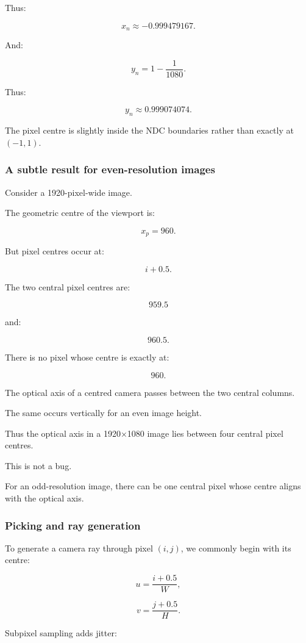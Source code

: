 Thus:

\[
 \boxed{x_n\approx-0.999479167}.
\]

And:

\[
 y_n=1-\frac1{1080}.
\]

Thus:

\[
 \boxed{y_n\approx0.999074074}.
\]

The pixel centre is slightly inside the NDC boundaries rather than exactly at \((-1,1)\).

\subsubsection{A subtle result for even-resolution images}\label{a-subtle-result-for-even-resolution-images}

Consider a 1920-pixel-wide image.

The geometric centre of the viewport is:

\[
 x_p=960.
\]

But pixel centres occur at:

\[
 i+0.5.
\]

The two central pixel centres are:

\[
 959.5
\]

and:

\[
 960.5.
\]

There is no pixel whose centre is exactly at:

\[
 960.
\]

The optical axis of a centred camera passes between the two central columns.

The same occurs vertically for an even image height.

Thus the optical axis in a 1920×1080 image lies between four central pixel centres.

This is not a bug.

For an odd-resolution image, there can be one central pixel whose centre aligns with the optical axis.

\subsubsection{Picking and ray generation}\label{picking-and-ray-generation}

To generate a camera ray through pixel \((i,j)\), we commonly begin with its centre:

\[
 u=\frac{i+0.5}{W},
\]

\[
 v=\frac{j+0.5}{H}.
\]

Subpixel sampling adds jitter:

